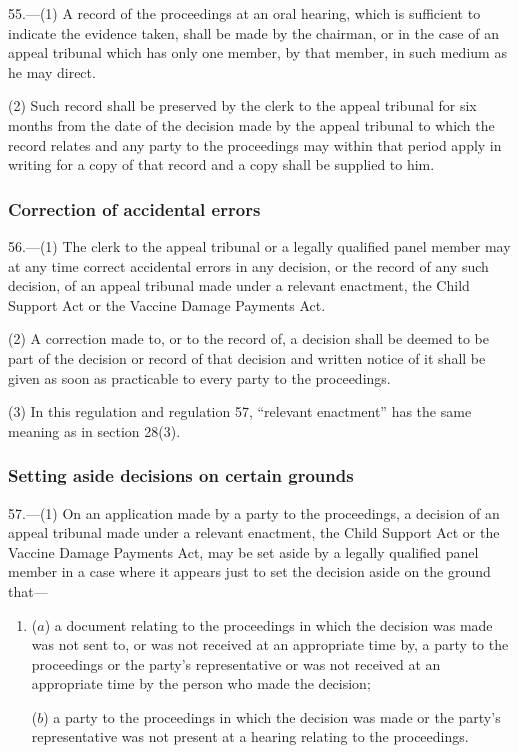 \documentclass[12pt,a4paper]{article}
\begin{document}
55.—(1) A record of the proceedings at an oral hearing, which is sufficient to indicate the evidence taken, shall be made by the chairman, or in the case of an appeal tribunal which has only one member, by that member, in such medium as he may direct.

(2) Such record shall be preserved by the clerk to the appeal tribunal for six months from the date of the decision made by the appeal tribunal to which the record relates and any party to the proceedings may within that period apply in writing for a copy of that record and a copy shall be supplied to him.

\subsubsection[56. Correction of accidental errors]{Correction of accidental errors}

56.—(1) The clerk to the appeal tribunal
or a legally qualified panel member  %
may at any time correct accidental errors in any decision, or the record of any such decision, of an appeal tribunal made under a relevant enactment, the Child Support Act or the Vaccine Damage Payments Act.

(2) A correction made to, or to the record of, a decision shall be deemed to be part of the decision or record of that decision and written notice of it shall be given as soon as practicable to every party to the proceedings.

(3) In this regulation and regulation 57, “relevant enactment” has the same meaning as in section 28(3).


\subsubsection[57. Setting aside decisions on certain grounds]{Setting aside decisions on certain grounds}

57.—(1) On an application made by a party to the proceedings, a decision of an appeal tribunal made under a relevant enactment, the Child Support Act or the Vaccine Damage Payments Act, may be set aside by a legally qualified panel member in a case where it appears just to set the decision aside on the ground that—
\begin{enumerate}\item[]
($a$) a document relating to the proceedings in which the decision was made was not sent to, or was not received at an appropriate time by, a party to the proceedings or the party’s representative or was not received at an appropriate time by the person who made the decision;

($b$) a party to the proceedings in which the decision was made or the party’s representative was not present at a hearing relating to the proceedings.
\end{enumerate}
\end{document}

